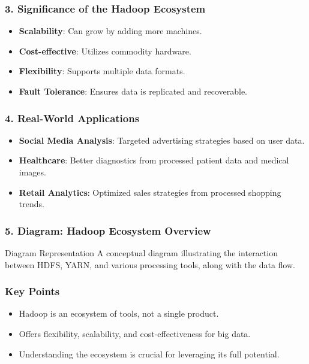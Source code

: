 \documentclass[aspectratio=169]{beamer}
\begin{document}
\begin{frame}[fragile]
    \frametitle{3. Significance of the Hadoop Ecosystem}
    \begin{itemize}
        \item \textbf{Scalability}: Can grow by adding more machines.
        \item \textbf{Cost-effective}: Utilizes commodity hardware.
        \item \textbf{Flexibility}: Supports multiple data formats.
        \item \textbf{Fault Tolerance}: Ensures data is replicated and recoverable.
    \end{itemize}
\end{frame}

\begin{frame}[fragile]
    \frametitle{4. Real-World Applications}
    \begin{itemize}
        \item \textbf{Social Media Analysis}: Targeted advertising strategies based on user data.
        \item \textbf{Healthcare}: Better diagnostics from processed patient data and medical images.
        \item \textbf{Retail Analytics}: Optimized sales strategies from processed shopping trends.
    \end{itemize}
\end{frame}

\begin{frame}[fragile]
    \frametitle{5. Diagram: Hadoop Ecosystem Overview}
    \begin{block}{Diagram Representation}
        A conceptual diagram illustrating the interaction between HDFS, YARN, and various processing tools, along with the data flow.
    \end{block}
\end{frame}

\begin{frame}[fragile]
    \frametitle{Key Points}
    \begin{itemize}
        \item Hadoop is an ecosystem of tools, not a single product.
        \item Offers flexibility, scalability, and cost-effectiveness for big data.
        \item Understanding the ecosystem is crucial for leveraging its full potential.
    \end{itemize}
\end{frame}
\end{document}
